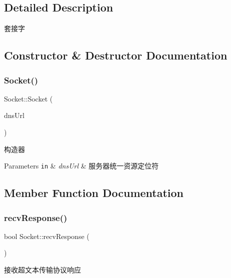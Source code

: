 \subsection{Detailed Description}
套接字 

\subsection{Constructor \& Destructor Documentation}
\mbox{\label{class_socket_a57f6077d6f5db44a5eb8624463ed99e4}} 
\subsubsection{\texorpdfstring{Socket()}{Socket()}}
{\footnotesize\ttfamily Socket\+::\+Socket (\begin{DoxyParamCaption}\item[{\hyperlink{class_dns_url}{Dns\+Url} const \&}]{dns\+Url }\end{DoxyParamCaption})}



构造器 


\begin{DoxyParams}[1]{Parameters}
\mbox{\tt in}  & {\em dns\+Url} & 服务器统一资源定位符 \\
\hline
\end{DoxyParams}


\subsection{Member Function Documentation}
\mbox{\label{class_socket_aa935a43a54d0ac03505b2ab32c095b99}} 
\subsubsection{\texorpdfstring{recv\+Response()}{recvResponse()}}
{\footnotesize\ttfamily bool Socket\+::recv\+Response (\begin{DoxyParamCaption}\item[{void}]{ }\end{DoxyParamCaption})}



接收超文本传输协议响应 


